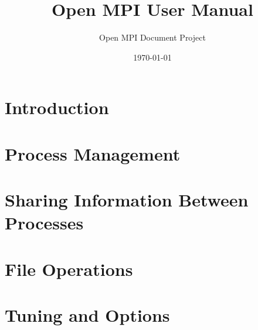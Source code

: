 \documentclass[12pt,twoside]{book}
\begin{document}
\title{Open MPI User Manual}
\author{Open MPI Document Project}
\date{\today}
\maketitle

\tableofcontents

\chapter{Introduction}


\chapter{Process Management}


\chapter{Sharing Information Between Processes}


\chapter{File Operations}


\chapter{Tuning and Options}

\end{document}
